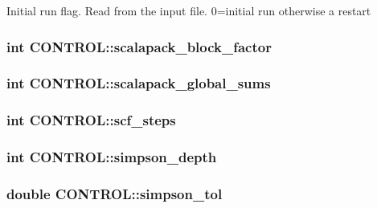 Initial run flag. Read from the input file. 0=initial run otherwise a restart \hypertarget{struct_c_o_n_t_r_o_l_a6f68feffcf9045d0dc105c16ee3068e2}{
\subsubsection[{scalapack\-\_\-block\-\_\-factor}]{\setlength{\rightskip}{0pt plus 5cm}int C\-O\-N\-T\-R\-O\-L\-::scalapack\-\_\-block\-\_\-factor}}\label{struct_c_o_n_t_r_o_l_a6f68feffcf9045d0dc105c16ee3068e2}
\hypertarget{struct_c_o_n_t_r_o_l_a7b91c878d089989a40f7919c9f4538ad}{
\subsubsection[{scalapack\-\_\-global\-\_\-sums}]{\setlength{\rightskip}{0pt plus 5cm}int C\-O\-N\-T\-R\-O\-L\-::scalapack\-\_\-global\-\_\-sums}}\label{struct_c_o_n_t_r_o_l_a7b91c878d089989a40f7919c9f4538ad}
\hypertarget{struct_c_o_n_t_r_o_l_aa6e26afb9102d861d0ee9cd3f8bce47e}{
\subsubsection[{scf\-\_\-steps}]{\setlength{\rightskip}{0pt plus 5cm}int C\-O\-N\-T\-R\-O\-L\-::scf\-\_\-steps}}\label{struct_c_o_n_t_r_o_l_aa6e26afb9102d861d0ee9cd3f8bce47e}
\hypertarget{struct_c_o_n_t_r_o_l_a6af34af5b51af180a545e0f101b6b3de}{
\subsubsection[{simpson\-\_\-depth}]{\setlength{\rightskip}{0pt plus 5cm}int C\-O\-N\-T\-R\-O\-L\-::simpson\-\_\-depth}}\label{struct_c_o_n_t_r_o_l_a6af34af5b51af180a545e0f101b6b3de}
\hypertarget{struct_c_o_n_t_r_o_l_a33ed3f7302129c8a3fcf6602275dfbcb}{
\subsubsection[{simpson\-\_\-tol}]{\setlength{\rightskip}{0pt plus 5cm}double C\-O\-N\-T\-R\-O\-L\-::simpson\-\_\-tol}}\label{struct_c_o_n_t_r_o_l_a33ed3f7302129c8a3fcf6602275dfbcb}
